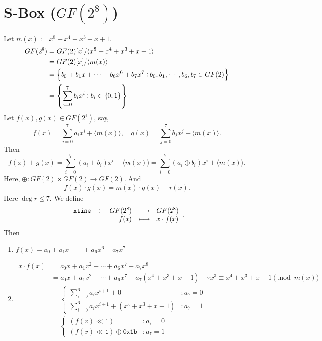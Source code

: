 \section{S-Box ($GF(2^8)$)}

Let $m(x):=x^8+x^4+x^3+x+1$.
\begin{align*}
	GF(2^8)&=GF(2)[x]/\langle x^8+x^4+x^3+x+1\rangle \\
	&=GF(2)[x]/\langle m(x)\rangle \\
	&=\set{b_0+b_1x+\cdots+b_6x^6+b_7x^7:b_0,b_1,\cdots, b_6,b_7\in GF(2)}\\
	&=\set{\sum_{i=0}^7b_ix^i:b_i\in\set{0,1}}.
\end{align*}
Let $f(x),g(x)\in GF(2^8)$, say, \[
f(x)=\sum_{i=0}^7a_ix^i+\langle m(x)\rangle,\quad g(x)=\sum_{j=0}^7b_jx^j+\langle m(x)\rangle.
\] Then
\[
f(x)+g(x)=\sum_{i=0}^7(a_i+b_i)x^i+\langle m(x)\rangle=\sum_{i=0}^7(a_i\oplus b_i)x^i+\langle m(x)\rangle.
\] Here, $\oplus:GF(2)\times GF(2)\to GF(2)$. And \begin{align*}
	f(x)\cdot g(x)=m(x)\cdot q(x) + r(x).
\end{align*} Here $\deg r \leq 7$.
\vfill
\noindent
We define \[
\fullfunction{\texttt{xtime}}{GF(2^8)}{GF(2^8)}{f(x)}{x\cdot f(x)}.
\]
Then \begin{enumerate}
	\item $f(x) = a_0 + a_1x + \cdots + a_6x^6 + a_7x^7$
	\item \begin{align*}
		x\cdot f(x) &= a_0x + a_1x^2 + \cdots + a_6x^7 + a_7x^8 \\
		&= a_0x + a_1x^2 + \cdots + a_6x^7 + a_7(x^4+x^3+x+1)\quad\because x^8\equiv x^4+x^3+x+1\pmod{m(x)} \\
		&=\begin{cases}
			\sum_{i=0}^6a_ix^{i+1} + 0 &:a_7=0\\
			\sum_{i=0}^6a_ix^{i+1} + (x^4+x^3+x+1) &:a_7=1
		\end{cases} \\
		&=\begin{cases}
			(f(x) \ll \texttt{1}) &:a_7=0\\
			(f(x) \ll \texttt{1}) \oplus \texttt{0x1b} &:a_7=1
		\end{cases}
	\end{align*}
\end{enumerate}



